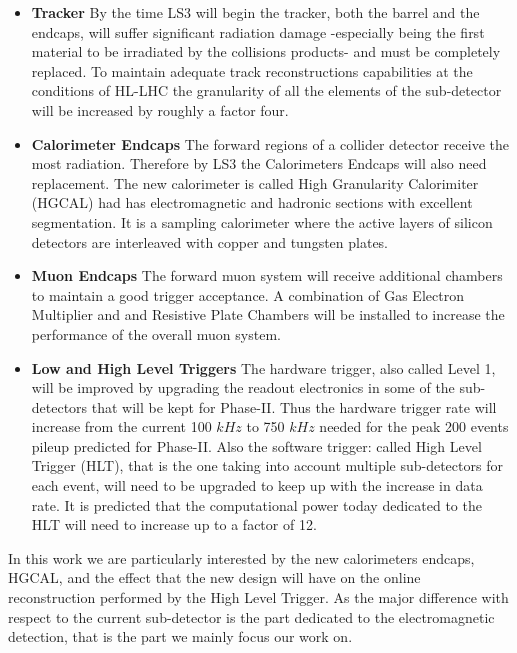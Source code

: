 \begin{itemize}
\item \textbf{Tracker} By the time LS3 will begin the tracker, both the barrel and the endcaps, will suffer significant radiation damage -especially being the first material to be irradiated by the collisions products- and must be completely replaced. To maintain adequate track reconstructions capabilities at the conditions of HL-LHC the granularity of all the elements of the sub-detector will be increased by roughly a factor four.
\item \textbf{Calorimeter Endcaps} The forward regions of a collider detector receive the most radiation. Therefore by LS3 the Calorimeters Endcaps will also need replacement. The new calorimeter is called High Granularity Calorimiter (HGCAL) had has electromagnetic and hadronic sections with excellent segmentation. It is a sampling calorimeter where the active layers of silicon detectors are interleaved with copper and tungsten plates.
\item \textbf{Muon Endcaps} The forward muon system will receive additional chambers to maintain a good trigger acceptance. A combination of Gas Electron Multiplier and and Resistive Plate Chambers will be installed to increase the performance of the overall muon system.
\item \textbf{Low and High Level Triggers} The hardware trigger, also called Level 1, will be improved by upgrading the readout electronics in some of the sub-detectors that will be kept for Phase-II. Thus the hardware trigger rate will increase from the current 100 $\unit{kHz}$ to 750 $\unit{kHz}$ needed for the peak 200 events pileup predicted for Phase-II. Also the software trigger: called High Level Trigger (HLT), that is the one taking into account multiple sub-detectors for each event, will need to be upgraded to keep up with the increase in data rate. It is predicted that the computational power today dedicated to the HLT will need to increase up to a factor of 12.
\end{itemize}

In this work we are particularly interested by the new calorimeters endcaps, HGCAL, and the effect that the new design will have on the online reconstruction performed by the High Level Trigger. As the major difference with respect to the current sub-detector is the part dedicated to the electromagnetic detection, that is the part we mainly focus our work on.

